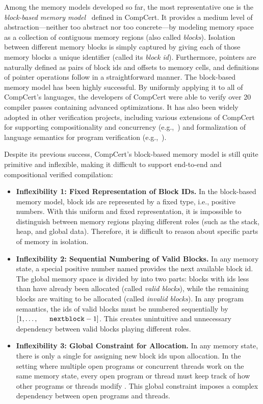 Among the memory models developed so far, the most representative one
is the \emph{block-based memory model}~\cite{leroy08,compcert-mem-v2}
defined in CompCert.  It provides a medium level of
abstraction---neither too abstract nor too concrete---by modeling
memory space as a collection of contiguous memory regions (also called
\emph{blocks}). Isolation between different memory blocks is simply
captured by giving each of those memory blocks a unique identifier
(called its \emph{block id}). Furthermore, pointers are naturally
defined as pairs of block ids and offsets to memory cells, and
definitions of pointer operations follow in a straightforward manner.
The block-based memory model has been highly successful. By uniformly
applying it to all of CompCert's languages, the developers of CompCert
were able to verify over 20 compiler passes containing advanced
optimizations.  It has also been widely adopted in other verification
projects, including various extensions of CompCert for supporting
compositionality and concurrency
(e.g.,~\cite{sevcik13,stewart15,compcertm,cascompcert,wang2019,wang2020,hur16,compcerts})
and formalization of language semantics for program verification
(e.g.,~\cite{appel11:vst,dscal15,ccal18}).

Despite its previous success, CompCert's block-based memory model is
still quite primitive and inflexible, making it difficult to support
end-to-end and compositional verified compilation: 

\begin{itemize}
\item 
\textbf{Inflexibility 1: Fixed Representation of Block IDs.}
%
In the block-based memory model, block ids are represented by a fixed
type, i.e., positive numbers. With this uniform and fixed
representation, it is impossible to distinguish between memory regions
playing different roles (such as the stack, heap, and global
data). Therefore, it is difficult to reason about specific parts of
memory in isolation.

\item
\textbf{Inflexibility 2: Sequential Numbering of Valid Blocks.}  
%
In any memory state, a special positive number named \nextblock
provides the next available block id. The global memory space is
divided by \nextblock into two parts: blocks with ids less than
\nextblock have already been allocated (called \emph{valid blocks}),
while the remaining blocks are waiting to be allocated (called
\emph{invalid blocks}). In any program semantics, the ids of valid
blocks must be numbered sequentially by $[1,\ldots,\nextblock-1]$.
This creates unintuitive and unnecessary dependency between valid
blocks playing different roles.

\item
\textbf{Inflexibility 3: Global Constraint for Allocation.}
%
In any memory state, there is only a single \nextblock for assigning
new block ids upon allocation. In the setting where multiple open
programs or concurrent threads work on the same memory state, every
open program or thread must keep track of how other programs or
threads modify \nextblock. This global constraint imposes a complex
dependency between open programs and threads.

\end{itemize}

